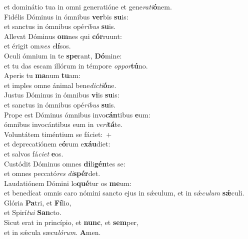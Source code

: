 \oddverse et dominátio tua in omni generatióne et gene\textit{ra}\textit{ti}\textbf{ó}nem.\\
\evenverse Fidélis Dóminus in ómnibus \textbf{ver}bis \textbf{su}is:~\*\\
\evenverse et sanctus in ómnibus opé\textit{ri}\textit{bus} \textbf{su}is.\\
\oddverse Allevat Dóminus \textbf{om}nes qui \textbf{cór}ruunt:~\*\\
\oddverse et érigit om\textit{nes} \textit{e}\textbf{lí}sos.\\
\evenverse Oculi ómnium in te \textbf{spe}rant, \textbf{Dó}mine:~\*\\
\evenverse et tu das escam illórum in témpore \textit{op}\textit{por}\textbf{tú}no.\\
\oddverse Aperis tu \textbf{ma}num \textbf{tu}am:~\*\\
\oddverse et imples omne ánimal bene\textit{di}\textit{cti}\textbf{ó}ne.\\
\evenverse Justus Dóminus in ómnibus \textbf{vi}is \textbf{su}is:~\*\\
\evenverse et sanctus in ómnibus opé\textit{ri}\textit{bus} \textbf{su}is.\\
\oddverse Prope est Dóminus ómnibus invo\textbf{cán}tibus \textbf{e}um:~\*\\
\oddverse ómnibus invocántibus eum in \textit{ve}\textit{ri}\textbf{tá}te.\\
\evenverse Voluntátem timéntium se fáciet:~+\\
\evenverse  et deprecatiónem e\textbf{ó}rum e\textbf{xáu}diet:~\*\\
\evenverse et salvos fá\textit{ci}\textit{et} \textbf{e}os.\\
\oddverse Custódit Dóminus omnes \textbf{di}li\textbf{gén}tes se:~\*\\
\oddverse et omnes peccató\textit{res} \textit{di}\textbf{spér}det.\\
\evenverse Laudatiónem Dómini lo\textbf{qué}tur os \textbf{me}um:~\*\\
\evenverse et benedícat omnis caro nómini sancto ejus in sǽculum, et in sǽ\textit{cu}\textit{lum} \textbf{sǽ}culi.\\
\oddverse Glória \textbf{Pa}tri, et \textbf{Fí}lio,~\*\\
\oddverse et Spirí\textit{tu}\textit{i} \textbf{San}cto.\\
\evenverse Sicut erat in princípio, et \textbf{nunc}, et \textbf{sem}per,~\*\\
\evenverse et in sǽcula sæcu\textit{ló}\textit{rum}. \textbf{A}men.\\
